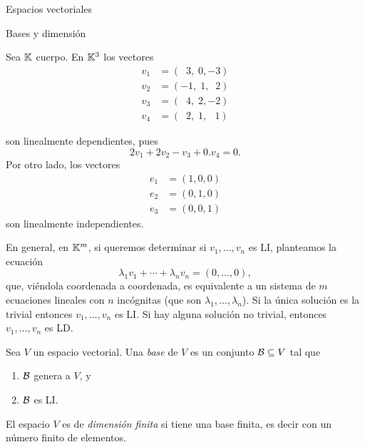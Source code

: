\begin{chapter}{Espacios vectoriales}
\begin{section}{Bases y dimensi\'on}
\begin{ejemplo*} Sea $\mathbb K$  cuerpo. En $\mathbb K^3$ los vectores
    \begin{align*}
    v_1 &= (\;\;3,\;0,-3) \\
    v_2 &= (-1,\;1,\;\;2) \\
    v_3 &= (\;\;4,\;2,-2) \\
    v_4 &= (\;\;2,\;1,\,\;\;1)
    \end{align*}
    
    son linealmente dependientes, pues
    $$
    2v_1+2v_2 -v_3 +0.v_4 =0.
    $$
    Por otro lado, los vectores
    \begin{align*}
    e_1 &= (1,0,0) \\
    e_2 &= (0,1,0) \\
    e_3 &= (0,0,1) 
    \end{align*}
    son linealmente independientes.
\end{ejemplo*}


\begin{observacion*}
    En  general,  en $\mathbb K^m$, si queremos determinar si  $v_1,\ldots,v_n$ es LI, planteamos la ecuación  
    \begin{equation*}
    \lambda_1v_1+\cdots+\lambda_nv_n=(0,\ldots,0),
    \end{equation*}
    que, viéndola coordenada a coordenada, es equivalente a un sistema de $m$ ecuaciones lineales con  $n$ incógnitas (que son $\lambda_1,\ldots,\lambda_n$). Si  la única solución es la trivial entonces $v_1,\ldots,v_n$ es LI. Si hay alguna solución no trivial, entonces $v_1,\ldots,v_n$ es LD. 
\end{observacion*}
 
 \begin{definicion}\label{def-base}
     Sea $V$ un espacio vectorial. Una \textit{base} de $V$ es un conjunto $\mathcal{B} \subseteq V$ tal que
     \begin{enumerate}
         \item\label{it.genera} $\mathcal{B}$ genera a $V$, y
         \item\label{it.li} $\mathcal{B}$ es LI.
     \end{enumerate}
      El espacio $V$ es de \textit{dimensión finita} si tiene una base finita,  es decir con  un número finito de elementos.
 \end{definicion}




\end{section}
\end{chapter}
